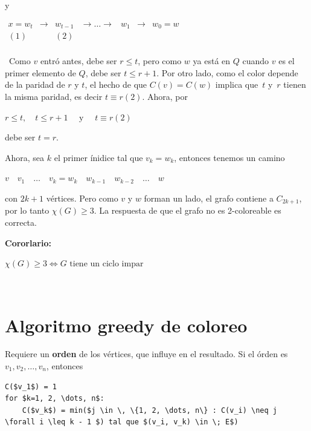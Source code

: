 \documentclass[10pt,a4paper]{article}
\begin{document}
\begin{center}
y
\end{center}

\begin{center}
$\begin{array}{ccccccc} x = w_t &\rightarrow &w_{t-1} &\rightarrow \dots \rightarrow &w_1 &\rightarrow &w_0 = w\\ (1) & &(2) & & & &\\ \end{array}$
\end{center}

 Como $v$ entró antes, debe ser $r\leq t$, pero como $w$ ya está en $Q$ cuando $v$ es el primer elemento de $Q$, debe ser $t \leq r + 1$. Por otro lado, como el color depende de la paridad de $r$ y $t$, el hecho de que $C(v) = C(w)$ implica que $t$ y $r$ tienen la misma paridad, es decir $t\equiv r( 2)$. Ahora, por

\begin{center}
$r \leq t,\quad t\leq r+1 \quad\text{ y }\quad t\equiv r(2)$
\end{center}

debe ser $t=r$.

Ahora, sea $k$ el primer ínidice tal que $v_k=w_k$, entonces tenemos un camino

\begin{center}
$v\quad v_1\quad\dots\quad v_k = w_k \quad w_{k-1}\quad w_{k-2} \quad \dots \quad w $
\end{center}

con $2 k + 1$ vértices. Pero como $v$ y $w$ forman un lado, el grafo contiene a $C_{2k+1}$, por lo tanto $\chi(G) \geq 3$. La respuesta de que el grafo no es 2-coloreable es correcta.

\textbf{Cororlario:}

$\chi(G) \geq 3 \Leftrightarrow G \text{ tiene un ciclo impar }$

 

\section*{Algoritmo greedy de coloreo}

Requiere un \textbf{orden} de los vértices, que influye en el resultado. Si el órden es $v_1, v_2, \dots, v_n$, entonces


    \begin{lstlisting}[language=pseudo]
C($v_1$) = 1
for $k=1, 2, \dots, n$:
    C($v_k$) = min($j \in \, \{1, 2, \dots, n\} : C(v_i) \neq j \forall i \leq k - 1 $) tal que $(v_i, v_k) \in \; E$)
\end{lstlisting}
\end{document}

